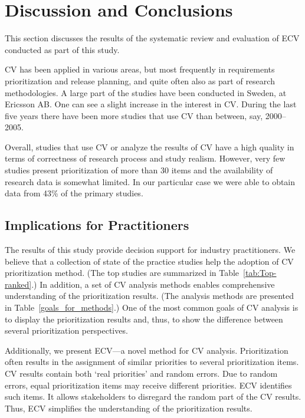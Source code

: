 
\section{Discussion and Conclusions\label{discussion}}
This section discusses the results of the systematic review and evaluation of ECV conducted as part of this study.

CV has been applied in various areas, but most frequently in requirements prioritization and release planning, and quite often also as part of research methodologies.
A large part of the studies have been conducted in Sweden, at Ericsson AB.%
One can see a slight increase in the interest in CV. During the last five years there have been more studies that use CV than between, say, 2000--2005.

Overall, studies that use CV or analyze the results of CV have a high quality in terms of correctness of research process and study realism.
However, very few studies present prioritization of more than 30 items and the availability of research data is somewhat limited. In our particular case we were able to obtain data from 43\% of the primary studies.

\subsection{Implications for Practitioners}
The results of this study provide decision support for industry practitioners.
We believe that a collection of state of the practice studies help the adoption of CV prioritization method. (The top studies are summarized in Table~\ref{tab:Top-ranked}.)
In addition, a set of CV analysis methods enables comprehensive understanding of the prioritization results. 
(The analysis methods are presented in Table~\ref{goals_for_methods}.)
One of the most common goals of CV analysis is to display the prioritization results and, thus, to show the difference between several prioritization perspectives.

Additionally, we present ECV---a novel method for CV analysis.
Prioritization often results in the assignment of similar priorities to several prioritization items.
CV results contain both `real priorities' and random errors.
Due to random errors, equal prioritization items may receive different priorities.
ECV identifies such items. It allows stakeholders to disregard the random part of the CV results.
Thus, ECV simplifies the understanding of the prioritization results.

